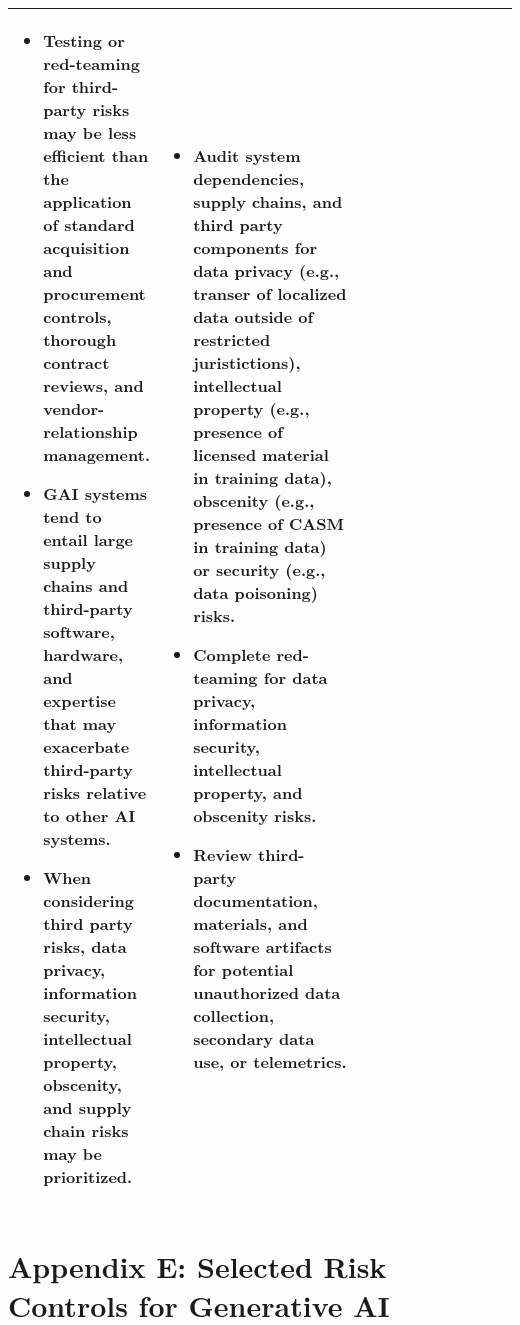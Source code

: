 \documentclass[fleqn]{article}
\begin{document}
\begin{table}[H]
\begin{tabular}{|m{0.25\linewidth} |m{0.40\linewidth} | m{0.35\linewidth} |}
		\begin{itemize}[noitemsep, leftmargin=*] 
			\item Testing or red-teaming for third-party risks may be less efficient than the application of standard acquisition and procurement controls, thorough contract reviews, and vendor-relationship management.
			\item GAI systems tend to entail large supply chains and third-party software, hardware, and expertise that may exacerbate third-party risks relative to other AI systems. 
			\item When considering third party risks, data privacy, information security, intellectual property, obscenity, and supply chain risks may be prioritized.
		\end{itemize} 
		& 
		\begin{itemize}[noitemsep, leftmargin=*] 
			\item Audit system dependencies, supply chains, and third party components for data privacy (e.g., transer of localized data outside of restricted juristictions), intellectual property (e.g., presence of licensed material in training data), obscenity (e.g., presence of CASM in training data) or security (e.g., data poisoning) risks.
			\item Complete red-teaming for data privacy, information security, intellectual property, and obscenity risks.
			\item Review third-party documentation, materials, and software artifacts for potential unauthorized data collection, secondary data use, or telemetrics.
		\end{itemize} \\
		\hline
	\end{tabular}
\end{table}

\section*{Appendix E: Selected Risk Controls for Generative AI}\label{sec:appndxe}
\end{document}
